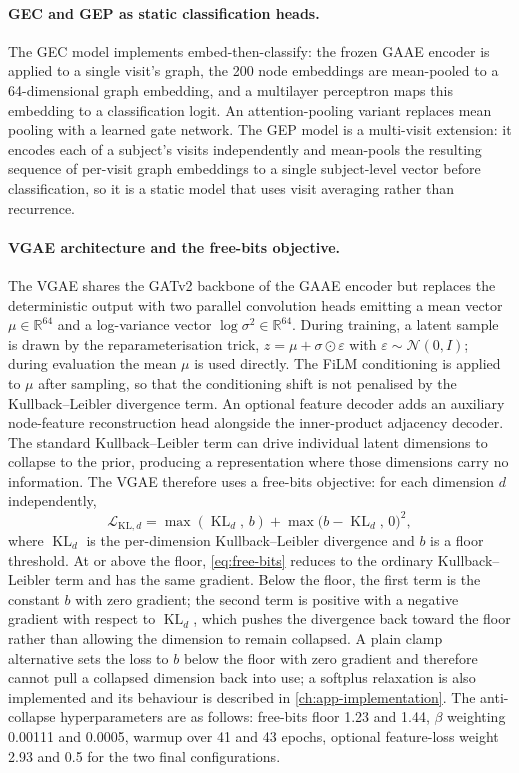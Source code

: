 \paragraph{GEC and GEP as static classification heads.}
The \ac{GEC} model implements embed-then-classify: the frozen \ac{GAAE} encoder is
applied to a single visit's graph, the 200 node embeddings are mean-pooled to a
64-dimensional graph embedding, and a multilayer perceptron maps this embedding to a
classification logit. An attention-pooling variant replaces mean pooling with a learned gate network. The \ac{GEP} model is a multi-visit extension: it encodes each of a subject's visits
independently and mean-pools the resulting sequence of per-visit graph embeddings to a
single subject-level vector before classification, so it is a static model that uses visit
averaging rather than recurrence.

\paragraph{VGAE architecture and the free-bits objective.}
The \ac{VGAE} shares the GATv2 backbone of the \ac{GAAE} encoder but replaces the
deterministic output with two parallel convolution heads emitting a mean vector
$\mu \in \mathbb{R}^{64}$ and a log-variance vector $\log\sigma^2 \in \mathbb{R}^{64}$.
During training, a latent sample is drawn by the reparameterisation trick,
$z = \mu + \sigma \odot \varepsilon$ with $\varepsilon \sim \mathcal{N}(0, I)$; during
evaluation the mean $\mu$ is used directly. The FiLM conditioning is applied to $\mu$
after sampling, so that the conditioning shift is not penalised by the Kullback--Leibler
divergence term. An
optional feature decoder adds an auxiliary node-feature reconstruction head alongside the
inner-product adjacency decoder. The standard Kullback--Leibler term can drive individual
latent dimensions to collapse to the prior, producing a representation where those
dimensions carry no information. The \ac{VGAE} therefore uses a free-bits objective: for
each dimension $d$ independently,
\begin{equation}
  \mathcal{L}_{\text{KL},d}
  = \max(\operatorname{KL}_d,\, b)
    + \max\!\bigl(b - \operatorname{KL}_d,\, 0\bigr)^2,
  \label{eq:free-bits}
\end{equation}
where $\operatorname{KL}_d$ is the per-dimension Kullback--Leibler divergence and $b$ is a
floor threshold. At or above the floor, \autoref{eq:free-bits} reduces to the ordinary
Kullback--Leibler term and has the same gradient. Below the floor, the first term is the
constant $b$ with zero gradient; the second term is positive with a negative gradient with
respect to $\operatorname{KL}_d$, which pushes the divergence back toward the floor rather
than allowing the dimension to remain collapsed. A plain clamp alternative sets the loss to
$b$ below the floor with zero gradient and therefore cannot pull a collapsed dimension
back into use; a softplus relaxation is also implemented and its behaviour is described in
\autoref{ch:app-implementation}. The anti-collapse hyperparameters are as follows: free-bits floor 1.23 and 1.44, $\beta$ weighting 0.00111 and 0.0005,
warmup over 41 and 43 epochs, optional feature-loss weight 2.93 and 0.5 for the two
final configurations.


